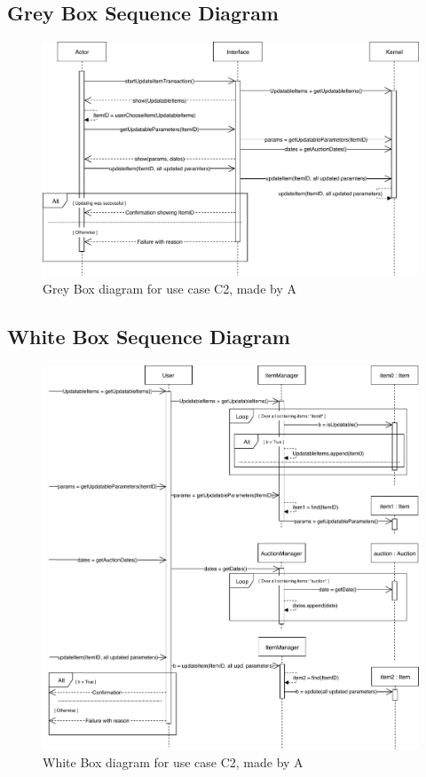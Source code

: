 \subsection*{Grey Box Sequence Diagram}
\begin{figure}[H]
	\centering
	\includegraphics[scale=.9]{uml/SD-gb-update.pdf}
	\caption*{Grey Box diagram for use case C2, made by A}
\end{figure}
\subsection*{White Box Sequence Diagram}
\begin{figure}[H]
	\centering
	\includegraphics[scale=.85]{uml/SD-wb-update.pdf}
	\caption*{White Box diagram for use case C2, made by A}
\end{figure}